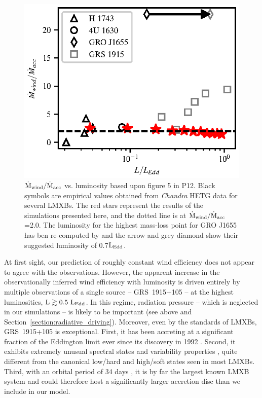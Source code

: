 \documentclass[a4paper,fleqn,usenatbib]{mnras}
\begin{document}
\begin{figure}
\includegraphics[width=\columnwidth]{figures/fig4_ponti.eps}
\caption{$\rm{\dot{M}_{wind}/\dot{M}_{acc}}$ vs. luminosity based upon figure 5 in P12. 
Black symbols are empirical values obtained from {\em Chandra} HETG data for several LMXBs. 
The red stars represent the results of the simulations presented here, and the dotted line
is at $\rm{\dot{M}_{wind}/\dot{M}_{acc}}$=2.0. The luminosity for the highest mass-loss
point for GRO J1655 has ben re-computed by  \protect\cite{2016ApJ...823..159S} and the
arrow and grey diamond show their suggested luminosity of 0.7$\rm{L_{Edd}}$.}
\label{figure:mdot_vs_lum}
\end{figure}


At first sight, our prediction of roughly constant wind efficiency
does not appear to agree with the observations. However, the apparent
increase in the observationally inferred wind efficiency with
luminosity is driven entirely by multiple observations of a single
source -- GRS~1915+105 -- at the highest
luminosities, $\rm{L \gtrsim 0.5~L_{Edd}}$. In this regime, radiation
pressure -- which is neglected in our simulations -- is likely to be
important (see above and Section~\ref{section:radiative_driving}). Moreover, even by the
standards of LMXBs, GRS~1915+105 is exceptional. First, it has been accreting
at a significant fraction of the Eddington limit ever since its
discovery in 1992
\citep{1994ApJS...92..469C,2017MNRAS.468.4748C}. Second, it exhibits
extremely unusual spectral states and variability properties
\citep[e.g.][]{2016ApJ...833..165Z}, quite different from the
canonical low/hard and high/soft states seen in most LMXBs. Third, 
with an orbital period of 34 days \citep{2014SSRv..183..223C}, it is
by far the largest known LMXB system and could therefore host a
significantly larger accretion disc than we include in our model.
\end{document}

